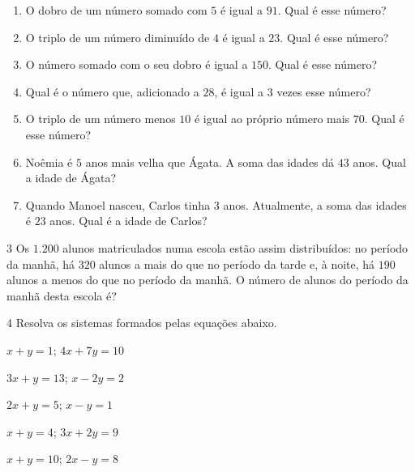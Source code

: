 \begin{enumerate}\def\labelenumi{\alph{enumi})}
\item O dobro de um número somado com $5$ é igual a $91$. Qual é esse número? 
\item O triplo de um número diminuído de $4$ é igual a $23$. Qual é esse número? 
\item O número somado com o seu dobro é igual a $150$. Qual é esse número? 
\item Qual é o número que, adicionado a $28$, é igual a $3$ vezes esse número? 
\item O triplo de um número menos $10$ é igual ao próprio número mais $70$. Qual é esse número? 
\item Noêmia é $5$ anos mais velha que Ágata. A soma das idades dá $43$ anos. Qual a idade de Ágata? 
\item Quando Manoel nasceu, Carlos tinha $3$ anos. Atualmente, a soma das idades é $23$ anos. Qual é a idade de Carlos? 
\end{enumerate}

\num{3}  Os $1.200$ alunos matriculados numa escola estão assim distribuídos: no
período da manhã, há $320$ alunos a mais do que no período da tarde e, à
noite, há $190$ alunos a menos do que no período da manhã. O número de
alunos do período da manhã desta escola é?


\num{4}  Resolva os sistemas formados pelas equações abaixo.

\begin{escolha}
\item $x + y = 1$; $4x + 7y = 10$ 
\item $3x + y = 13$; $x - 2y = 2$ 
\item $2x + y = 5$; $x - y = 1$ 
\item $x + y = 4$; $3x + 2y = 9$ 
\item $x + y = 10$; $2x - y = 8$ 
\end{escolha}


